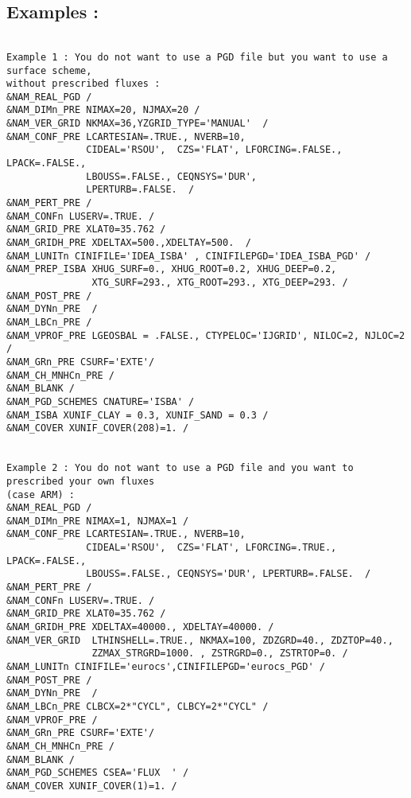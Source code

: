 \subsection{Examples  :}
\begin{verbatim}

Example 1 : You do not want to use a PGD file but you want to use a surface scheme, 
without prescribed fluxes :
&NAM_REAL_PGD /
&NAM_DIMn_PRE NIMAX=20, NJMAX=20 /
&NAM_VER_GRID NKMAX=36,YZGRID_TYPE='MANUAL'  /
&NAM_CONF_PRE LCARTESIAN=.TRUE., NVERB=10,
              CIDEAL='RSOU',  CZS='FLAT', LFORCING=.FALSE., LPACK=.FALSE.,
              LBOUSS=.FALSE., CEQNSYS='DUR',
              LPERTURB=.FALSE.  /
&NAM_PERT_PRE /
&NAM_CONFn LUSERV=.TRUE. /
&NAM_GRID_PRE XLAT0=35.762 / 
&NAM_GRIDH_PRE XDELTAX=500.,XDELTAY=500.  /
&NAM_LUNITn CINIFILE='IDEA_ISBA' , CINIFILEPGD='IDEA_ISBA_PGD' /
&NAM_PREP_ISBA XHUG_SURF=0., XHUG_ROOT=0.2, XHUG_DEEP=0.2,
               XTG_SURF=293., XTG_ROOT=293., XTG_DEEP=293. / 
&NAM_POST_PRE /
&NAM_DYNn_PRE  /
&NAM_LBCn_PRE / 
&NAM_VPROF_PRE LGEOSBAL = .FALSE., CTYPELOC='IJGRID', NILOC=2, NJLOC=2 /
&NAM_GRn_PRE CSURF='EXTE'/
&NAM_CH_MNHCn_PRE /
&NAM_BLANK /
&NAM_PGD_SCHEMES CNATURE='ISBA' /
&NAM_ISBA XUNIF_CLAY = 0.3, XUNIF_SAND = 0.3 /
&NAM_COVER XUNIF_COVER(208)=1. /   


Example 2 : You do not want to use a PGD file and you want to prescribed your own fluxes 
(case ARM) :
&NAM_REAL_PGD /
&NAM_DIMn_PRE NIMAX=1, NJMAX=1 /
&NAM_CONF_PRE LCARTESIAN=.TRUE., NVERB=10,
              CIDEAL='RSOU',  CZS='FLAT', LFORCING=.TRUE., LPACK=.FALSE.,
              LBOUSS=.FALSE., CEQNSYS='DUR', LPERTURB=.FALSE.  /
&NAM_PERT_PRE /
&NAM_CONFn LUSERV=.TRUE. /
&NAM_GRID_PRE XLAT0=35.762 / 
&NAM_GRIDH_PRE XDELTAX=40000., XDELTAY=40000. /
&NAM_VER_GRID  LTHINSHELL=.TRUE., NKMAX=100, ZDZGRD=40., ZDZTOP=40.,
               ZZMAX_STRGRD=1000. , ZSTRGRD=0., ZSTRTOP=0. /
&NAM_LUNITn CINIFILE='eurocs',CINIFILEPGD='eurocs_PGD' /
&NAM_POST_PRE /
&NAM_DYNn_PRE  /
&NAM_LBCn_PRE CLBCX=2*"CYCL", CLBCY=2*"CYCL" / 
&NAM_VPROF_PRE /
&NAM_GRn_PRE CSURF='EXTE'/
&NAM_CH_MNHCn_PRE /
&NAM_BLANK /
&NAM_PGD_SCHEMES CSEA='FLUX  ' /
&NAM_COVER XUNIF_COVER(1)=1. /


\end{verbatim}
